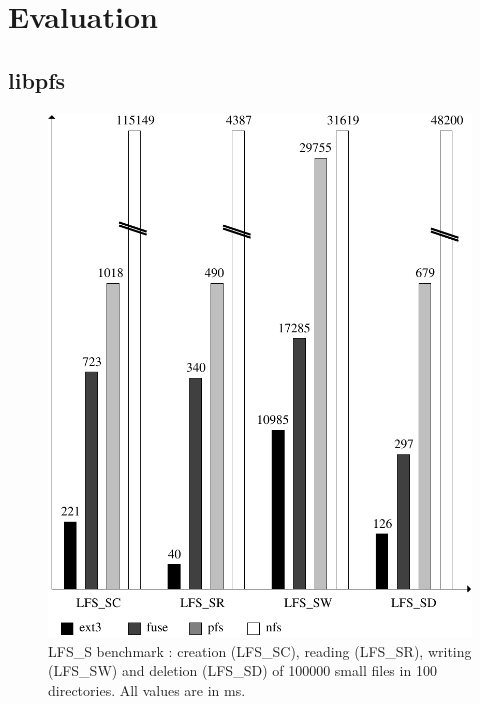 
\section{Evaluation}
\label{sec:eval}


\subsection{libpfs}

\begin{figure}[ht]
\begin{center}
  \includegraphics [scale=0.55] {fig/lfs_s}
  \caption{\label{LfsS}
    {\small LFS\_S benchmark : creation (LFS\_SC), reading (LFS\_SR),
      writing (LFS\_SW) and deletion (LFS\_SD) of 100000 small files
      in 100 directories. All values are in ms.}}
\end{center}
\end{figure}

